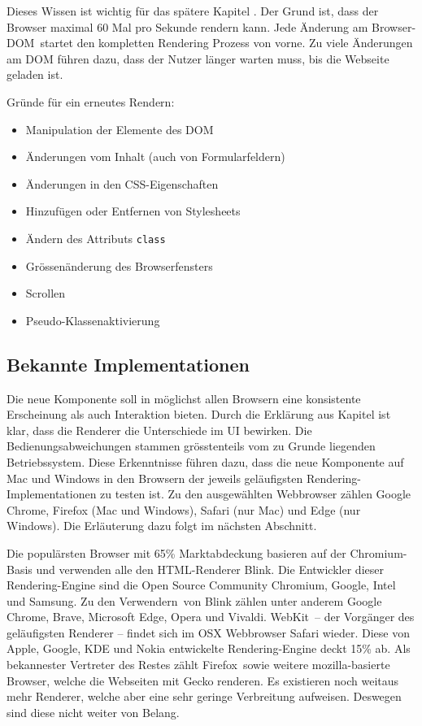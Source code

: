Dieses Wissen ist wichtig für das spätere Kapitel . 
Der Grund ist, dass der Browser maximal 60 Mal pro Sekunde rendern kann.
Jede Änderung am Browser-DOM\footnotemark \ startet den kompletten Rendering Prozess von vorne.
Zu viele Änderungen am DOM führen dazu, dass der Nutzer länger warten muss, bis die Webseite geladen ist.

Gründe für ein erneutes Rendern\footnotemark :

\begin{itemize}
    \item Manipulation der Elemente des DOM
    \item Änderungen vom Inhalt (auch von Formularfeldern)
    \item Änderungen in den CSS-Eigenschaften
    \item Hinzufügen oder Entfernen von Stylesheets
    \item Ändern des Attributs \texttt{class}
    \item Grössenänderung des Browserfensters
    \item Scrollen
    \item Pseudo-Klassenaktivierung
\end{itemize}


\subsection{Bekannte Implementationen}
\label{sec:implementationsRenderer}

Die neue Komponente soll in möglichst allen Browsern eine konsistente Erscheinung als auch Interaktion bieten.
Durch die Erklärung aus Kapitel  ist klar, dass die Renderer die Unterschiede im UI bewirken.
Die Bedienungsabweichungen stammen grösstenteils vom zu Grunde liegenden Betriebssystem.
Diese Erkenntnisse führen dazu, dass die neue Komponente auf Mac und Windows in den Browsern der jeweils geläufigsten Rendering-Implementationen zu testen ist.
Zu den ausgewählten Webbrowser zählen Google Chrome, Firefox (Mac und Windows), Safari (nur Mac) und Edge (nur Windows).
Die Erläuterung dazu folgt im nächsten Abschnitt.

Die populärsten Browser mit 65\% Marktabdeckung basieren auf der Chromium-Basis und verwenden alle den HTML-Renderer Blink\footnotemark.
Die Entwickler dieser Rendering-Engine sind die Open Source Community Chromium, Google, Intel und Samsung.
Zu den Verwendern\footnotemark \ von Blink zählen unter anderem Google Chrome, Brave, Microsoft Edge, Opera und Vivaldi.
WebKit\footnotemark \ – der Vorgänger des geläufigsten Renderer – findet sich im OSX Webbrowser Safari wieder.
Diese von Apple, Google, KDE und Nokia entwickelte Rendering-Engine deckt 15\% ab.
Als bekannester Vertreter des Restes zählt Firefox\footnotemark \ sowie weitere mozilla-basierte Browser, welche die Webseiten mit Gecko renderen.
Es existieren noch weitaus mehr Renderer, welche aber eine sehr geringe Verbreitung aufweisen.
Deswegen sind diese nicht weiter von Belang.
